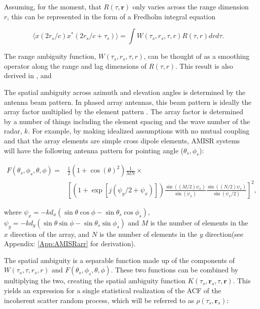 Assuming, for the moment, that $R(\tau,\mathbf{r})$ only varies across the range dimension $r$, this can be represented in the form of a Fredholm integral equation
 
 \begin{equation}
 \label{eqn:fredfirst}
 \langle x(2r_s/c)x^*(2r_s/c+\tau_s)\rangle = \int W(\tau_s,r_s,\tau,r)R(\tau,r) drd\tau.
 \end{equation}
 
\noindent The range ambiguity function, $W(\tau_s,r_s,\tau,r)$, can be thought of as a smoothing operator along the range and lag dimensions of $R(\tau,r)$. This result is also derived in \citep{nikoukar2008}, \citep{Woodman:1991is} and \citep{hysell2008}

 
The spatial ambiguity across azimuth and elevation angles is determined by the antenna beam pattern. In phased array antennas, this beam pattern is ideally the array factor multiplied by the element pattern \citep{Balanis:2005:ATA:1208379}. The array factor is determined by a number of things including the element spacing and the wave number of the radar, $k$. For example, by making idealized assumptions with no mutual coupling and that the array elements are simple cross dipole elements, AMISR systems will have the following antenna pattern for pointing angle ($\theta_s,\phi_s$): 

 \begin{equation}
 \label{eqn:amisrpat}
 \begin{split}
F(\theta_s,\phi_s,\theta,\phi) =& \frac{1}{2}(1+\cos(\theta)^2)\frac{1}{MN} \times \\
	&\left[ \left(1+\exp\left[j(\psi_y/2 + \psi_x)\right]\right)\frac{\sin((M/2) \psi_x)}{\sin(\psi_x)} \frac{\sin((N/2) \psi_x)}{\sin(\psi_x/2)}\right]^2,
\end{split}
 \end{equation}
 
 \noindent where $\psi_x = -k d_x(\sin\theta\cos\phi-\sin\theta_s\cos\phi_s)$, $\psi_y = -k d_y(\sin\theta\sin\phi-\sin\theta_s\sin\phi_s)$ and $M$ is the number of elements in the $x$ direction of the array, and $N$ is the number of elements in the $y$ direction(see Appendix: \ref{App:AMISRarr} for derivation).


The spatial ambiguity is a separable function made up of the components of $W(\tau_s,\tau,r_s,r)$ and $F(\theta_s,\phi_s,\theta,\phi)$. These two functions can be combined by multiplying the two, creating the spatial ambiguity function  $K(\tau_s,\mathbf{r}_s,\tau,\mathbf{r})$. This yields an expression for a single statistical realization of the ACF of the incoherent scatter random process, which will be referred to as $\rho(\tau_s,\mathbf{r}_s)$:


